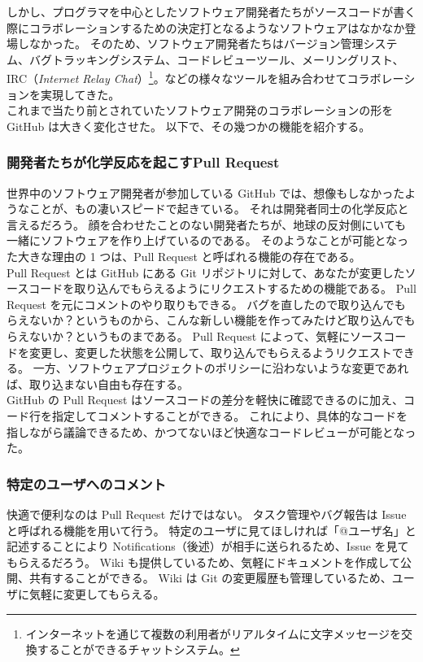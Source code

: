 しかし、プログラマを中心としたソフトウェア開発者たちがソースコードが書く際にコラボレーションするための決定打となるようなソフトウェアはなかなか登場しなかった。
そのため、ソフトウェア開発者たちはバージョン管理システム、バグトラッキングシステム、コードレビューツール、メーリングリスト、IRC（\emph{Internet Relay Chat}）\footnote{インターネットを通じて複数の利用者がリアルタイムに文字メッセージを交換することができるチャットシステム。}。などの様々なツールを組み合わせてコラボレーションを実現してきた。\\

これまで当たり前とされていたソフトウェア開発のコラボレーションの形を GitHub は大きく変化させた。
以下で、その幾つかの機能を紹介する。
\subsubsection{開発者たちが化学反応を起こすPull Request}
世界中のソフトウェア開発者が参加している GitHub では、想像もしなかったようなことが、もの凄いスピードで起きている。
それは開発者同士の化学反応と言えるだろう。
顔を合わせたことのない開発者たちが、地球の反対側にいても一緒にソフトウェアを作り上げているのである。
そのようなことが可能となった大きな理由の 1 つは、Pull Request と呼ばれる機能の存在である。\\

Pull Request とは GitHub にある Git リポジトリに対して、あなたが変更したソースコードを取り込んでもらえるようにリクエストするための機能である。
Pull Request を元にコメントのやり取りもできる。
バグを直したので取り込んでもらえないか？というものから、こんな新しい機能を作ってみたけど取り込んでもらえないか？というものまである。
Pull Request によって、気軽にソースコードを変更し、変更した状態を公開して、取り込んでもらえるようリクエストできる。
一方、ソフトウェアプロジェクトのポリシーに沿わないような変更であれば、取り込まない自由も存在する。\\

GitHub の Pull Request はソースコードの差分を軽快に確認できるのに加え、コード行を指定してコメントすることができる。
これにより、具体的なコードを指しながら議論できるため、かつてないほど快適なコードレビューが可能となった。
\subsubsection{特定のユーザへのコメント}
快適で便利なのは Pull Request だけではない。
タスク管理やバグ報告は Issue と呼ばれる機能を用いて行う。
特定のユーザに見てほしければ「@ユーザ名」と記述することにより Notifications（後述）が相手に送られるため、Issue を見てもらえるだろう。
Wiki も提供しているため、気軽にドキュメントを作成して公開、共有することができる。
Wiki は Git の変更履歴も管理しているため、ユーザに気軽に変更してもらえる。

